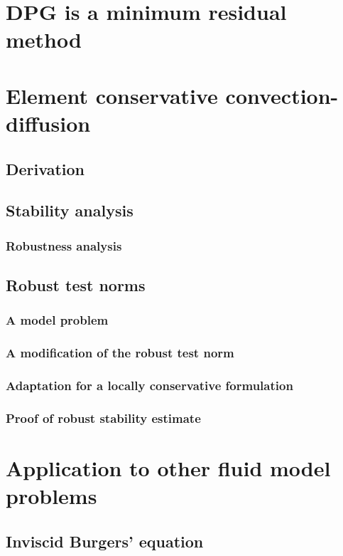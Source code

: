 \documentclass[12pt]{report}
\begin{document}
\section{DPG is a minimum residual method}


\section{Element conservative convection-diffusion}

\subsection{Derivation}

\subsection{Stability analysis}
\subsubsection{Robustness analysis}

\subsection{Robust test norms}
\subsubsection{A model problem}
\subsubsection{A modification of the robust test norm}
\subsubsection{Adaptation for a locally conservative formulation}
\subsubsection{Proof of robust stability estimate}


\section{Application to other fluid model problems}

\subsection{Inviscid Burgers' equation}
\end{document}
